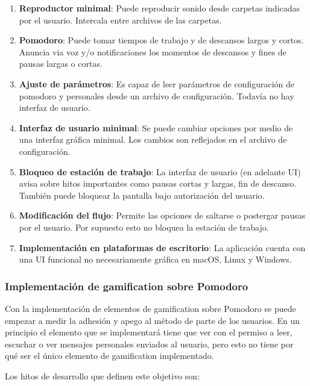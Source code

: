\documentclass[12pt,letterpaper]{report}
\providecommand{\tightlist}{%
  \setlength{\itemsep}{0pt}\setlength{\parskip}{0pt}}
\begin{document}
\begin{enumerate}\tightlist{}
  \item \textbf{Reproductor minimal}: Puede reproducir sonido desde carpetas indicadas por el usuario. Intercala entre
    archivos de las carpetas.
  \item \textbf{Pomodoro}: Puede tomar tiempos de trabajo y de descansos largos y cortos. Anuncia via voz y/o
    notificaciones los momentos de descansos y fines de pausas largas o cortas.
  \item \textbf{Ajuste de parámetros}: Es capaz de leer parámetros de configuración de pomodoro y personales desde un archivo de
    configuración. Todavía no hay interfaz de usuario.
  \item \textbf{Interfaz de usuario minimal}: Se puede cambiar opciones por medio de una interfaz gráfica minimal. Los cambios
    son reflejados en el archivo de configuración.
  \item \textbf{Bloqueo de estación de trabajo}: La interfaz de usuario (en adelante UI) avisa sobre hitos importantes como
    pausas cortas y largas, fin de descanso. También puede bloquear la pantalla bajo autorización del usuario.
  \item \textbf{Modificación del flujo}: Permite las opciones de saltarse o postergar pausas por el usuario. Por supuesto esto no
    bloquea la estación de trabajo.
  \item \textbf{Implementación en plataformas de escritorio}: La aplicación cuenta con una UI funcional no necesariamente gráfica
    en macOS, Linux y Windows.
\end{enumerate}

\subsubsection{Implementación de gamification sobre Pomodoro}\label{implementacion-de-gamification-sobre-pomodoro}

Con la implementación de elementos de gamification sobre Pomodoro se puede empezar a medir la adhesión y apego al método
de parte de los usuarios. En un principio el elemento que se implementará tiene que ver con el permiso a leer, escuchar
o ver mensajes personales enviados al usuario, pero esto no tiene por qué ser el único elemento de gamification
implementado.

Los hitos de desarrollo que definen este objetivo son:
\end{document}
